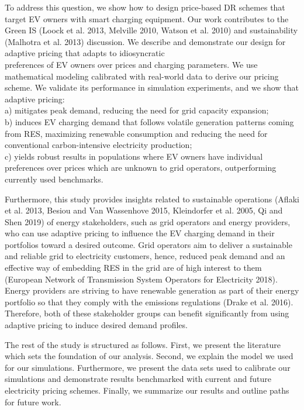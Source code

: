 \documentclass[10pt]{article}
\begin{document}
To address this question, we show how to design price-based DR schemes that target EV owners with smart charging equipment. Our work contributes to the Green IS (Loock et al. 2013, Melville 2010, Watson et al. 2010) and sustainability (Malhotra et al. 2013) discussion. We describe and demonstrate our design for adaptive pricing that adapts to idiosyncratic\\
preferences of EV owners over prices and charging parameters. We use mathematical modeling calibrated with real-world data to derive our pricing scheme. We validate its performance in simulation experiments, and we show that adaptive pricing:\\
a) mitigates peak demand, reducing the need for grid capacity expansion;\\
b) induces EV charging demand that follows volatile generation patterns coming from RES, maximizing renewable consumption and reducing the need for conventional carbon-intensive electricity production;\\
c) yields robust results in populations where EV owners have individual preferences over prices which are unknown to grid operators, outperforming currently used benchmarks.

Furthermore, this study provides insights related to sustainable operations (Aflaki et al. 2013, Besiou and Van Wassenhove 2015, Kleindorfer et al. 2005, Qi and Shen 2019) of energy stakeholders, such as grid operators and energy providers, who can use adaptive pricing to influence the EV charging demand in their portfolios toward a desired outcome. Grid operators aim to deliver a sustainable and reliable grid to electricity customers, hence, reduced peak demand and an effective way of embedding RES in the grid are of high interest to them (European Network of Transmission System Operators for Electricity 2018). Energy providers are striving to have renewable generation as part of their energy portfolio so that they comply with the emissions regulations (Drake et al. 2016). Therefore, both of these stakeholder groups can benefit significantly from using adaptive pricing to induce desired demand profiles.

The rest of the study is structured as follows. First, we present the literature which sets the foundation of our analysis. Second, we explain the model we used for our simulations. Furthermore, we present the data sets used to calibrate our simulations and demonstrate results benchmarked with current and future electricity pricing schemes. Finally, we summarize our results and outline paths for future work.
\end{document}
